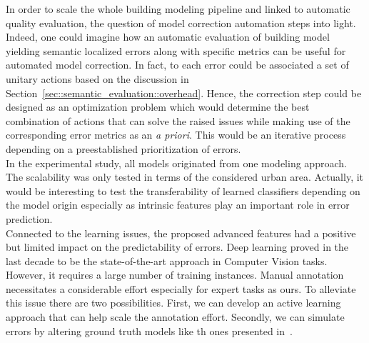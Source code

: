     In order to scale the whole building modeling pipeline and linked to automatic quality evaluation, the question of model correction automation steps into light.
    Indeed, one could imagine how an automatic evaluation of building model yielding semantic localized errors along with specific metrics can be useful for automated model correction.
    In fact, to each error could be associated a set of unitary actions based on the discussion in Section~\ref{sec::semantic_evaluation::overhead}.
    Hence, the correction step could be designed as an optimization problem which would determine the best combination of actions that can solve the raised issues while making use of the corresponding error metrics as an \textit{a priori}.
    This would be an iterative process depending on a preestablished prioritization of errors.\\
    
    In the experimental study, all models originated from one modeling approach.
    The scalability was only tested in terms of the considered urban area.
    Actually, it would be interesting to test the transferability of learned classifiers depending on the model origin especially as intrinsic features play an important role in error prediction.\\

    Connected to the learning issues, the proposed advanced features had a positive but limited impact on the predictability of errors.
    Deep learning proved in the last decade to be the state-of-the-art approach in Computer Vision tasks.
    However, it requires a large number of training instances.
    Manual annotation necessitates a considerable effort especially for expert tasks as ours.
    To alleviate this issue there are two possibilities.
    First, we can develop an active learning approach that can help scale the annotation effort.
    Secondly, we can simulate errors by altering ground truth models like th ones presented in~\parencite{rottensteiner2012isprs}.
